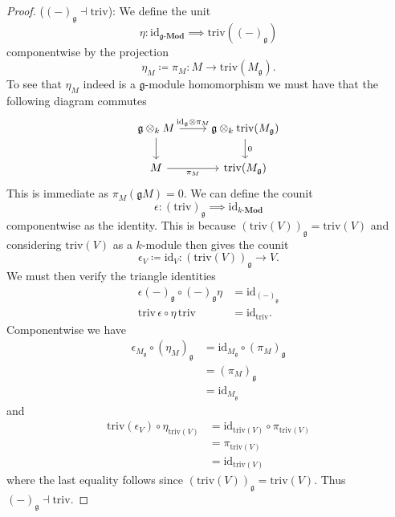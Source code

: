 \begin{proof}
  ($ (-)_{\mathfrak{g}} \dashv \text{triv} $): We define the unit
  \begin{equation}
    \eta: \text{id}_{\mathfrak{g}\text{-}\mathbf{Mod}} \implies \text{triv}((-)_\mathfrak{g})
  \end{equation}
  componentwise by the projection
  \begin{equation}
    \eta_M \coloneqq \pi_M : M \to \text{triv}(M_\mathfrak{g}).
  \end{equation}
  To see that $ \eta_M $ indeed is a $ \mathfrak{g} $-module homomorphism we must have that the following diagram commutes
  \[\begin{tikzcd}
	  {\mathfrak{g} \otimes_kM} & {\mathfrak{g}\otimes_k\text{triv}(M_\mathfrak{g})} \\
	  M & {\text{triv}(M_\mathfrak{g})}
	  \arrow["0", from=1-2, to=2-2]
	  \arrow["{\text{id}_\mathfrak{g} \otimes \pi_M}", from=1-1, to=1-2]
	  \arrow[from=1-1, to=2-1]
	  \arrow["{\pi_M}"', from=2-1, to=2-2]
  \end{tikzcd}\]
  This is immediate as $ \pi_M(\mathfrak{g}M) = 0 $. We can define the counit
  \begin{equation}
    \epsilon:(\text{triv})_\mathfrak{g} \implies \text{id}_{k\text{-}\mathbf{Mod}}
  \end{equation}
  componentwise as the identity. This is because $ (\text{triv}(V))_\mathfrak{g}=\text{triv}(V) $ and considering $ \text{triv}(V) $ as a $ k $-module then gives the counit
  \begin{equation}
    \epsilon_V \coloneqq \text{id}_V:(\text{triv}(V))_\mathfrak{g} \to V.
  \end{equation}
  We must then verify the triangle identities
  \begin{align*}
    \epsilon(-)_\mathfrak{g} \circ (-)_\mathfrak{g}\eta &= \text{id}_{(-)_\mathfrak{g}} \\
    \text{triv}\,\epsilon \circ \eta\,\text{triv} &= \text{id}_{\text{triv}}
  .\end{align*}
  Componentwise we have
  \begin{align*}
    \epsilon_{M_{\mathfrak{g}}} \circ (\eta_M)_\mathfrak{g} &= \text{id}_{M_{\mathfrak{g}}} \circ (\pi_M)_\mathfrak{g} \\
                                                            &= (\pi_M)_\mathfrak{g} \\
                                                            &= \text{id}_{M_\mathfrak{g}}
  \end{align*}
  and
  \begin{align*}
    \text{triv}(\epsilon_V) \circ \eta_{\text{triv}(V)} &= \text{id}_{\text{triv}(V)} \circ \pi_{\text{triv}(V)} \\
                                                        &= \pi_{\text{triv}(V)} \\
                                                        &= \text{id}_{\text{triv}(V)}
  \end{align*}
  where the last equality follows since $ (\text{triv}(V))_\mathfrak{g} = \text{triv}(V) $. Thus $ (-)_\mathfrak{g} \dashv \text{triv} $.



\end{proof}
